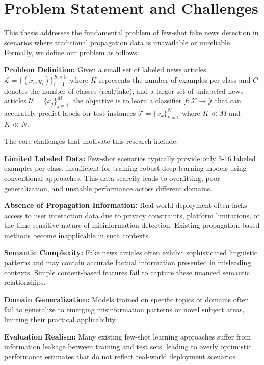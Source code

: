 \section{Problem Statement and Challenges}

This thesis addresses the fundamental problem of few-shot fake news detection in scenarios where traditional propagation data is unavailable or unreliable. Formally, we define our problem as follows:

\textbf{Problem Definition:} Given a small set of labeled news articles $\mathcal{L} = \{(x_i, y_i)\}_{i=1}^{K \times C}$ where $K$ represents the number of examples per class and $C$ denotes the number of classes (real/fake), and a larger set of unlabeled news articles $\mathcal{U} = \{x_j\}_{j=1}^{M}$, the objective is to learn a classifier $f: \mathcal{X} \rightarrow \mathcal{Y}$ that can accurately predict labels for test instances $\mathcal{T} = \{x_k\}_{k=1}^{N}$ where $K \ll M$ and $K \ll N$.

The core challenges that motivate this research include:

\textbf{Limited Labeled Data:} Few-shot scenarios typically provide only 3-16 labeled examples per class, insufficient for training robust deep learning models using conventional approaches. This data scarcity leads to overfitting, poor generalization, and unstable performance across different domains.

\textbf{Absence of Propagation Information:} Real-world deployment often lacks access to user interaction data due to privacy constraints, platform limitations, or the time-sensitive nature of misinformation detection. Existing propagation-based methods become inapplicable in such contexts.

\textbf{Semantic Complexity:} Fake news articles often exhibit sophisticated linguistic patterns and may contain accurate factual information presented in misleading contexts. Simple content-based features fail to capture these nuanced semantic relationships.

\textbf{Domain Generalization:} Models trained on specific topics or domains often fail to generalize to emerging misinformation patterns or novel subject areas, limiting their practical applicability.

\textbf{Evaluation Realism:} Many existing few-shot learning approaches suffer from information leakage between training and test sets, leading to overly optimistic performance estimates that do not reflect real-world deployment scenarios.

